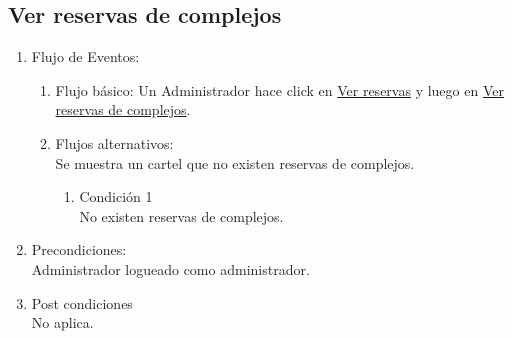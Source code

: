 \documentclass[a4paper,11pt]{article}
\begin{document}
\subsection{Ver reservas de complejos}
\begin{enumerate}


    \begin{enumerate}
    \item Descripción breve: \\
        Se listan las reservas de complejos.
    \item Actores \\
        Administrador.
    \item Disparadores: \\
        Click en el botón \underline{Ver reservas de complejos}
        dentro de la página principal del administrador.
    \end{enumerate}

    \item Flujo de Eventos: 

    \begin{enumerate}

        \item Flujo básico:
            Un Administrador hace click en \underline{Ver reservas} y luego
            en \underline{Ver reservas de complejos}.
        \item Flujos alternativos:\\
            Se muestra un cartel que no existen reservas de complejos.
            \begin{enumerate}
                \item Condición 1 \\
                    No existen reservas de complejos.
            \end{enumerate}

    \end{enumerate}

    \item Precondiciones: \\
        Administrador logueado como administrador.

    \item Post condiciones \\
        No aplica.

\end{enumerate}
\end{document}
